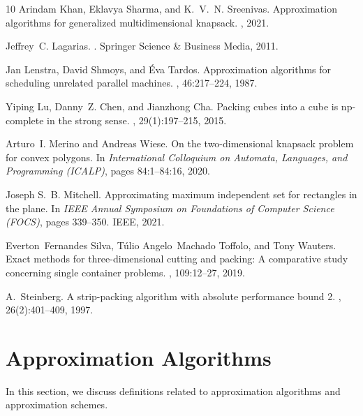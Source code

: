 \documentclass[10pt,a4paper]{amsart}
\theoremstyle{definition}
\begin{document}
\begin{thebibliography}{10}
Arindam Khan, Eklavya Sharma, and K.~V.~N. Sreenivas.
\newblock Approximation algorithms for generalized multidimensional knapsack.
, 2021.

Jeffrey~C. Lagarias.
.
\newblock Springer Science \& Business Media, 2011.

Jan Lenstra, David Shmoys, and Éva Tardos.
\newblock Approximation algorithms for scheduling unrelated parallel machines.
, 46:217--224, 1987.

Yiping Lu, Danny~Z. Chen, and Jianzhong Cha.
\newblock Packing cubes into a cube is np-complete in the strong sense.
, 29(1):197--215, 2015.

Arturo~I. Merino and Andreas Wiese.
\newblock On the two-dimensional knapsack problem for convex polygons.
\newblock In {\em International Colloquium on Automata, Languages, and
  Programming (ICALP)}, pages 84:1--84:16, 2020.

Joseph S.~B. Mitchell.
\newblock Approximating maximum independent set for rectangles in the plane.
\newblock In {\em IEEE Annual Symposium on Foundations of Computer Science
  (FOCS)}, pages 339--350. {IEEE}, 2021.

Everton~Fernandes Silva, T{\'u}lio Angelo~Machado Toffolo, and Tony Wauters.
\newblock Exact methods for three-dimensional cutting and packing: A
  comparative study concerning single container problems.
, 109:12--27, 2019.

A.~Steinberg.
\newblock A strip-packing algorithm with absolute performance bound 2.
, 26(2):401--409, 1997.

\end{thebibliography}
\appendix

\section{Approximation Algorithms}
\label{sec:approx}

In this section, we discuss definitions related to approximation algorithms and approximation schemes.
\end{document}
